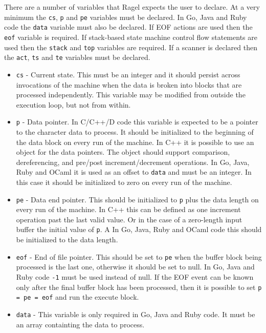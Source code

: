 \documentclass[letterpaper,11pt,oneside]{book}
\begin{document}
There are a number of variables that Ragel expects the user to declare. At a
very minimum the \verb|cs|, \verb|p| and \verb|pe| variables must be declared.
In Go, Java and Ruby code the \verb|data| variable must also be declared. If
EOF actions are used then the \verb|eof| variable is required. If
stack-based state machine control flow statements are used then the
\verb|stack| and \verb|top| variables are required. If a scanner is declared
then the \verb|act|, \verb|ts| and \verb|te| variables must be
declared.

\begin{itemize}

\item \verb|cs| - Current state. This must be an integer and it should persist
across invocations of the machine when the data is broken into blocks that are
processed independently. This variable may be modified from outside the
execution loop, but not from within.

\item \verb|p| - Data pointer. In C/C++/D code this variable is expected to be a
pointer to the character data to process. It should be initialized to the
beginning of the data block on every run of the machine. In C++ it is possible
to use an object for the data pointers. The object should support comparison,
dereferencing, and pre/post increment/decrement operations. In Go, Java, Ruby
and OCaml it is used as an offset to \verb|data| and must be an integer. In this
case it should be initialized to zero on every run of the machine.

\item \verb|pe| - Data end pointer. This should be initialized to \verb|p| plus
the data length on every run of the machine. In C++ this can be defined as one
increment operation past the last valid value. Or in the case of a zero-length
input buffer the initial value of \verb|p|. A In Go, Java, Ruby and OCaml code this
should be initialized to the data length.

\item \verb|eof| - End of file pointer. This should be set to \verb|pe| when
the buffer block being processed is the last one, otherwise it should be set to
null. In Go, Java and Ruby code \verb|-1| must be used instead of null. If the EOF
event can be known only after the final buffer block has been processed, then
it is possible to set \verb|p = pe = eof| and run the execute block.

\item \verb|data| - This variable is only required in Go, Java and Ruby code. It
must be an array containting the data to process.


\end{itemize}
\end{document}
